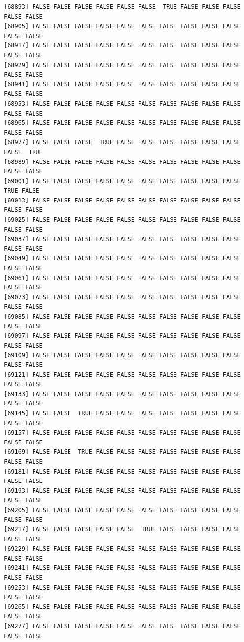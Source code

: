 \documentclass[
  a4paper,
  DIV=11,
  numbers=noendperiod]{scrartcl}
\begin{document}
\begin{verbatim}
[68893] FALSE FALSE FALSE FALSE FALSE FALSE  TRUE FALSE FALSE FALSE FALSE FALSE
[68905] FALSE FALSE FALSE FALSE FALSE FALSE FALSE FALSE FALSE FALSE FALSE FALSE
[68917] FALSE FALSE FALSE FALSE FALSE FALSE FALSE FALSE FALSE FALSE FALSE FALSE
[68929] FALSE FALSE FALSE FALSE FALSE FALSE FALSE FALSE FALSE FALSE FALSE FALSE
[68941] FALSE FALSE FALSE FALSE FALSE FALSE FALSE FALSE FALSE FALSE FALSE FALSE
[68953] FALSE FALSE FALSE FALSE FALSE FALSE FALSE FALSE FALSE FALSE FALSE FALSE
[68965] FALSE FALSE FALSE FALSE FALSE FALSE FALSE FALSE FALSE FALSE FALSE FALSE
[68977] FALSE FALSE FALSE  TRUE FALSE FALSE FALSE FALSE FALSE FALSE FALSE  TRUE
[68989] FALSE FALSE FALSE FALSE FALSE FALSE FALSE FALSE FALSE FALSE FALSE FALSE
[69001] FALSE FALSE FALSE FALSE FALSE FALSE FALSE FALSE FALSE FALSE  TRUE FALSE
[69013] FALSE FALSE FALSE FALSE FALSE FALSE FALSE FALSE FALSE FALSE FALSE FALSE
[69025] FALSE FALSE FALSE FALSE FALSE FALSE FALSE FALSE FALSE FALSE FALSE FALSE
[69037] FALSE FALSE FALSE FALSE FALSE FALSE FALSE FALSE FALSE FALSE FALSE FALSE
[69049] FALSE FALSE FALSE FALSE FALSE FALSE FALSE FALSE FALSE FALSE FALSE FALSE
[69061] FALSE FALSE FALSE FALSE FALSE FALSE FALSE FALSE FALSE FALSE FALSE FALSE
[69073] FALSE FALSE FALSE FALSE FALSE FALSE FALSE FALSE FALSE FALSE FALSE FALSE
[69085] FALSE FALSE FALSE FALSE FALSE FALSE FALSE FALSE FALSE FALSE FALSE FALSE
[69097] FALSE FALSE FALSE FALSE FALSE FALSE FALSE FALSE FALSE FALSE FALSE FALSE
[69109] FALSE FALSE FALSE FALSE FALSE FALSE FALSE FALSE FALSE FALSE FALSE FALSE
[69121] FALSE FALSE FALSE FALSE FALSE FALSE FALSE FALSE FALSE FALSE FALSE FALSE
[69133] FALSE FALSE FALSE FALSE FALSE FALSE FALSE FALSE FALSE FALSE FALSE FALSE
[69145] FALSE FALSE  TRUE FALSE FALSE FALSE FALSE FALSE FALSE FALSE FALSE FALSE
[69157] FALSE FALSE FALSE FALSE FALSE FALSE FALSE FALSE FALSE FALSE FALSE FALSE
[69169] FALSE FALSE  TRUE FALSE FALSE FALSE FALSE FALSE FALSE FALSE FALSE FALSE
[69181] FALSE FALSE FALSE FALSE FALSE FALSE FALSE FALSE FALSE FALSE FALSE FALSE
[69193] FALSE FALSE FALSE FALSE FALSE FALSE FALSE FALSE FALSE FALSE FALSE FALSE
[69205] FALSE FALSE FALSE FALSE FALSE FALSE FALSE FALSE FALSE FALSE FALSE FALSE
[69217] FALSE FALSE FALSE FALSE FALSE  TRUE FALSE FALSE FALSE FALSE FALSE FALSE
[69229] FALSE FALSE FALSE FALSE FALSE FALSE FALSE FALSE FALSE FALSE FALSE FALSE
[69241] FALSE FALSE FALSE FALSE FALSE FALSE FALSE FALSE FALSE FALSE FALSE FALSE
[69253] FALSE FALSE FALSE FALSE FALSE FALSE FALSE FALSE FALSE FALSE FALSE FALSE
[69265] FALSE FALSE FALSE FALSE FALSE FALSE FALSE FALSE FALSE FALSE FALSE FALSE
[69277] FALSE FALSE FALSE FALSE FALSE FALSE FALSE FALSE FALSE FALSE FALSE FALSE

\end{verbatim}
\end{document}
